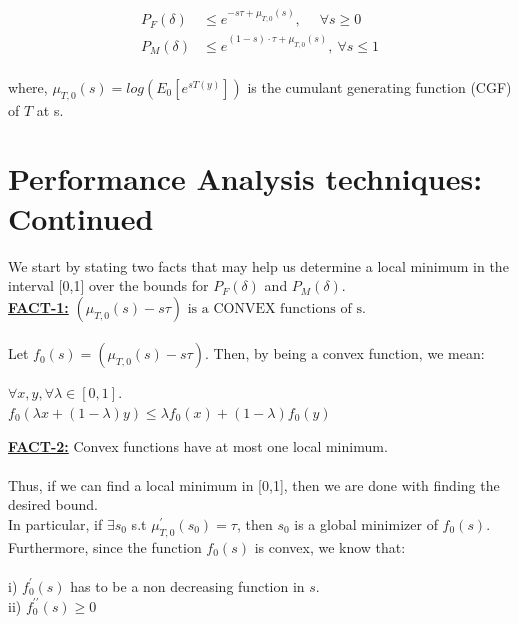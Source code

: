 \documentclass[12pt]{report}
\begin{document}
         \begin{equation}
         \begin{aligned}
                 P_F(\delta)&\leq e^{-s\tau+\mu_{T,0}(s)},\:\:\:\:\,~\forall s\geq 0 \\
                P_M(\delta)&\leq e^{(1-s)\cdot\tau +\mu_{T,0}(s)},~\forall s\leq1 \\
        \end{aligned}
        \end{equation}


\noindent where,
$\mu_{T,0}(s) = log(E_0[e^{sT(y)}])$ is the cumulant generating function (CGF) of $T$ at s.\\


\section{Performance Analysis techniques: Continued }

We start by stating two facts that may help us determine a local minimum in the interval [0,1] over the bounds for $P_F(\delta)$ and $P_M(\delta)$. \\   

\noindent \textbf{\underline{FACT-1:}} $(\mu_{T,0}(s)-s\tau)  \text{ is a  CONVEX functions of s.}$\\
\\

\noindent Let $f_0(s) = (\mu_{T,0}(s)-s\tau) $. Then, by being a convex function, we mean:

            \begin{center}
                  $\forall x,y, \forall \lambda \in [0,1].$\\
                  $f_0(\lambda x + (1- \lambda)y)\le \lambda f_0(x)+(1-\lambda)f_0(y)$\\
            \end{center}


\noindent \textbf{\underline{FACT-2:}} Convex functions have at most one local minimum. \\\\ Thus, if we can find a local minimum in [0,1], then we are done with finding the desired bound.\\
In particular, if $\exists s_0$ s.t  $\mu^\prime_{T,0}(s_0)=\tau$, then $s_0$ is a global minimizer of $f_0(s)$.\\

\noindent Furthermore, since the function $f_0(s)$ is convex, we know that: \\\\
i) $f^\prime_0(s)$ has to be a non decreasing function in $s$. \\
ii) $ f^{\prime \prime}_0(s) \geq 0 $ \\
\end{document}
